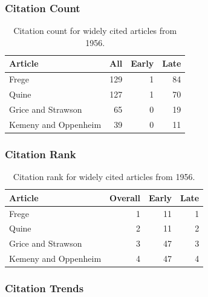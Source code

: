 \documentclass[
  10pt,
  letterpaper,
  DIV=11,
  numbers=noendperiod,
  twoside]{scrartcl}
\begin{document}
\subsubsection*{Citation Count}\label{sec-count-1956}

\begin{longtable}[]{@{}lrrr@{}}

\caption{\label{tbl-citation-count-1956}Citation count for widely cited
articles from 1956.}

\tabularnewline

\toprule\noalign{}
Article & All & Early & Late \\
\midrule\noalign{}
\endhead
\bottomrule\noalign{}
\endlastfoot
Frege & 129 & 1 & 84 \\
Quine & 127 & 1 & 70 \\
Grice and Strawson & 65 & 0 & 19 \\
Kemeny and Oppenheim & 39 & 0 & 11 \\

\end{longtable}

\subsubsection*{Citation Rank}\label{sec-rank-1956}

\begin{longtable}[]{@{}lrrr@{}}

\caption{\label{tbl-citation-rank-1956}Citation rank for widely cited
articles from 1956.}

\tabularnewline

\toprule\noalign{}
Article & Overall & Early & Late \\
\midrule\noalign{}
\endhead
\bottomrule\noalign{}
\endlastfoot
Frege & 1 & 11 & 1 \\
Quine & 2 & 11 & 2 \\
Grice and Strawson & 3 & 47 & 3 \\
Kemeny and Oppenheim & 4 & 47 & 4 \\

\end{longtable}

\subsubsection*{Citation Trends}\label{sec-trends-1956}
\end{document}
